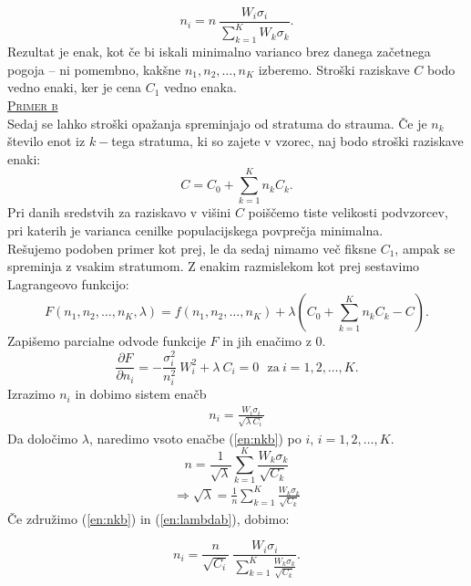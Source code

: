 \documentclass[a4paper,12pt]{article}
\begin{document}
$$ n_i = n \ \frac{W_i \sigma_i}{\sum_{k = 1}^{K} W_k \sigma_k}. $$
Rezultat je enak, kot če bi iskali minimalno varianco brez danega začetnega pogoja -- ni pomembno, kakšne $n_1, n_2, \ldots, n_K$ izberemo. Stroški raziskave $C$ bodo vedno enaki, ker je cena $C_1$ vedno enaka.
\\

\noindent
\textsc{\underline{Primer b}}
\\
Sedaj se lahko stroški opažanja spreminjajo od stratuma do strauma. Če je $n_k$ število enot iz $k-$tega stratuma, ki so zajete v vzorec, naj bodo stroški raziskave enaki:
$$ C = C_0 + \sum_{k = 1}^{K}n_k C_k. $$
Pri danih sredstvih za raziskavo v višini $C$ poiščemo tiste velikosti podvzorcev, pri katerih je varianca cenilke populacijskega povprečja minimalna.
\\
Rešujemo podoben primer kot prej, le da sedaj nimamo več fiksne $C_1$, ampak se spreminja z vsakim stratumom. 
Z enakim razmislekom kot prej sestavimo Lagrangeovo funkcijo:
$$ F(n_1, n_2, \ldots, n_K, \lambda) = f(n_1, n_2, \ldots, n_K) + \lambda (C_0 + \sum_{k = 1}^{K} n_k C_k - C). $$
Zapišemo parcialne odvode funkcije $F$ in jih enačimo z $0$.
$$ \frac{ \partial F}{\partial n_i} = - \frac{ \sigma_i^2}{n_i^2} \  W_i^2 + \lambda \ C_i = 0 \ \ \ \text{za} \ i = 1, 2, \ldots, K.  $$
Izrazimo $n_i$ in dobimo sistem enačb
\begin{align}\label{en:nkb}
n_i = \frac{W_i \sigma_i}{ \sqrt{ \lambda \ C_i}}
\end{align}
Da določimo $\lambda$, naredimo vsoto enačbe (\ref{en:nkb}) po $i$, $i = 1, 2, \ldots, K.$
$$ n = \frac{1}{\sqrt{\lambda}} \sum_{k = 1}^{K} \frac{W_k \sigma_k}{\sqrt{C_k}} $$
\begin{align}\label{en:lambdab}
\Rightarrow \sqrt{\lambda} = \frac{1}{n} \sum_{k = 1}^{K} \frac{W_k \sigma_k}{\sqrt{C_k}}
\end{align}
Če združimo (\ref{en:nkb}) in (\ref{en:lambdab}), dobimo:

$$ n_i = \frac{n}{\sqrt{C_i}} \ \frac{W_i \sigma_i}{\sum_{k = 1}^{K} \frac{W_k \sigma_k}{\sqrt{C_k}}}. $$
\\
\end{document}
